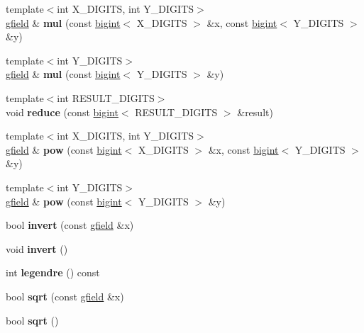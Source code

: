 \begin{DoxyCompactItemize}
{\footnotesize template$<$int X\+\_\+\+D\+I\+G\+I\+TS, int Y\+\_\+\+D\+I\+G\+I\+TS$>$ }\\\hyperlink{structgfield}{gfield} \& {\bfseries mul} (const \hyperlink{structbigint}{bigint}$<$ X\+\_\+\+D\+I\+G\+I\+TS $>$ \&x, const \hyperlink{structbigint}{bigint}$<$ Y\+\_\+\+D\+I\+G\+I\+TS $>$ \&y)
\item 
\mbox{\label{structgfield_af5cb4fb548dd14324f350c90d549f461}} 
{\footnotesize template$<$int Y\+\_\+\+D\+I\+G\+I\+TS$>$ }\\\hyperlink{structgfield}{gfield} \& {\bfseries mul} (const \hyperlink{structbigint}{bigint}$<$ Y\+\_\+\+D\+I\+G\+I\+TS $>$ \&y)
\item 
\mbox{\label{structgfield_ac0d0507456fbaa1525e4383532316127}} 
{\footnotesize template$<$int R\+E\+S\+U\+L\+T\+\_\+\+D\+I\+G\+I\+TS$>$ }\\void {\bfseries reduce} (const \hyperlink{structbigint}{bigint}$<$ R\+E\+S\+U\+L\+T\+\_\+\+D\+I\+G\+I\+TS $>$ \&result)
\item 
\mbox{\label{structgfield_afda302aa7c801d63f7dabeb2167a571e}} 
{\footnotesize template$<$int X\+\_\+\+D\+I\+G\+I\+TS, int Y\+\_\+\+D\+I\+G\+I\+TS$>$ }\\\hyperlink{structgfield}{gfield} \& {\bfseries pow} (const \hyperlink{structbigint}{bigint}$<$ X\+\_\+\+D\+I\+G\+I\+TS $>$ \&x, const \hyperlink{structbigint}{bigint}$<$ Y\+\_\+\+D\+I\+G\+I\+TS $>$ \&y)
\item 
\mbox{\label{structgfield_aaa66f33709a8e0a9a621b2b4cce55234}} 
{\footnotesize template$<$int Y\+\_\+\+D\+I\+G\+I\+TS$>$ }\\\hyperlink{structgfield}{gfield} \& {\bfseries pow} (const \hyperlink{structbigint}{bigint}$<$ Y\+\_\+\+D\+I\+G\+I\+TS $>$ \&y)
\item 
\mbox{\label{structgfield_ad0268b80caff487f70f6d56c72a06ef8}} 
bool {\bfseries invert} (const \hyperlink{structgfield}{gfield} \&x)
\item 
\mbox{\label{structgfield_a07a5ebadf9f5ad3fc66855f9ae7bc2db}} 
void {\bfseries invert} ()
\item 
\mbox{\label{structgfield_abbce2c607098b7f9a8a6745ede06d6df}} 
int {\bfseries legendre} () const
\item 
\mbox{\label{structgfield_a58b2b4ef05f8c04b007cba51be100116}} 
bool {\bfseries sqrt} (const \hyperlink{structgfield}{gfield} \&x)
\item 
\mbox{\label{structgfield_aa322270ecd1e50a7453173794d046ffe}} 
bool {\bfseries sqrt} ()
\end{DoxyCompactItemize}
